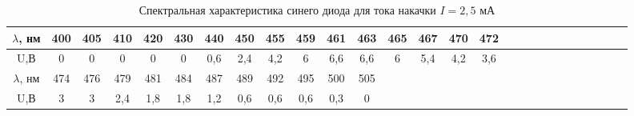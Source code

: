 \documentclass[a4paper,12pt]{article}
\begin{document}
\begin{table}[h!]
	\caption{Спектральная характеристика синего диода для тока накачки $I = 2,5$ мА}
	\begin{tabular}{|c|c|c|c|c|c|c|c|c|c|c|c|c|c|c|c|c|c|c|c|c|c|c|c|c|c|c|}
	\hline
	$\lambda$, нм & 400 & 405 & 410 & 420 & 430 & 440 & 450 & 455 & 459 & 461 & 463 & 465 & 467 & 470 & 472 \\ \hline
	U,В        & 0   & 0   & 0   & 0   & 0   & 0,6 & 2,4 & 4,2 & 6   & 6,6 & 6,6 & 6   & 5,4 & 4,2 & 3,6 \\ \hline
	$\lambda$, нм & 474 & 476 & 479 & 481 & 484 & 487 & 489 & 492 & 495 & 500 & 505 \\ \hline
	U,В        & 3   & 3   & 2,4 & 1,8 & 1,8 & 1,2 & 0,6 & 0,6 & 0,6 & 0,3 & 0 \\ \hline   
	\end{tabular}
\end{table}

\newpage
\end{document}

